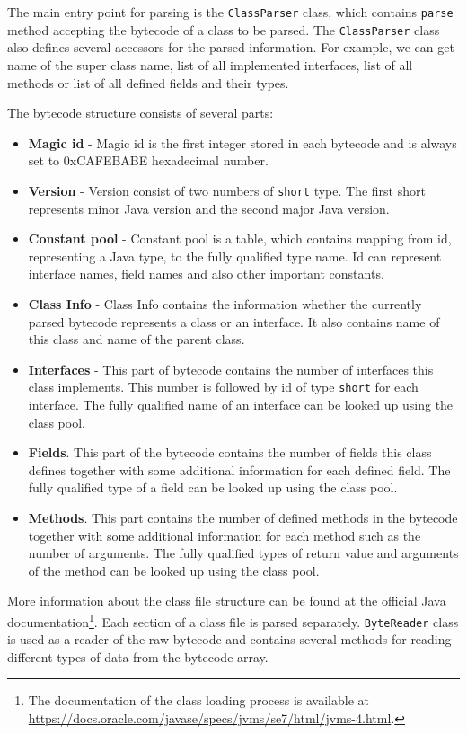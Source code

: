The main entry point for parsing is the \texttt{ClassParser} class, which contains \texttt{parse} method accepting the bytecode of a class to be parsed. The \texttt{ClassParser} class also defines several accessors for the parsed information. For example, we can get name of the super class name, list of all implemented interfaces, list of all methods or list of all defined fields and their types.

The bytecode structure consists of several parts:
\begin{itemize}
	\item \textbf{Magic id} - Magic id is the first integer stored in each bytecode and is always set to 0xCAFEBABE hexadecimal number.
	\item \textbf{Version} - Version consist of two numbers of \texttt{short} type. The first short represents minor Java version and the second major Java version.
	\item \textbf{Constant pool} - Constant pool is a table, which contains mapping from id, representing a Java type, to the fully qualified type name. Id can represent interface names, field names and also other important constants.
	\item \textbf{Class Info} - Class Info contains the information whether the currently parsed bytecode represents a class or an interface. It also contains name of this class and name of the parent class.
	\item \textbf{Interfaces} - This part of bytecode contains the number of interfaces this class implements. This number is followed by id of type \texttt{short} for each interface. The fully qualified name of an interface can be looked up using the class pool.
	\item \textbf{Fields}. This part of the bytecode contains the number of fields this class defines together with some additional information for each defined field. The fully qualified type of a field can be looked up using the class pool.
	\item \textbf{Methods}. This part contains the number of defined methods in the bytecode together with some additional information for each method such as the number of arguments. The fully qualified types of return value and arguments of the method can be looked up using the class pool.
\end{itemize}
More information about the class file structure can be found at the official Java documentation\footnote{The documentation of the class loading process is available at \url{https://docs.oracle.com/javase/specs/jvms/se7/html/jvms-4.html}.}.
Each section of a class file is parsed separately. \texttt{ByteReader} class is used as a reader of the raw bytecode and contains several methods for reading different types of data from the bytecode array. 

